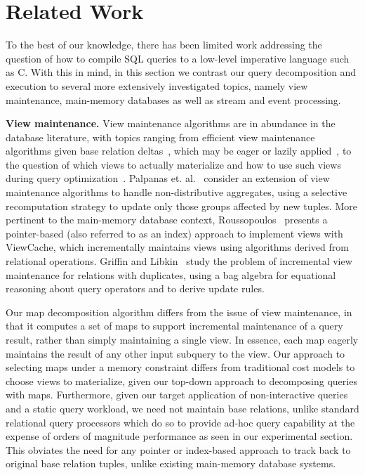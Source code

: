 \section{Related Work}

To the best of our knowledge, there has been limited work addressing the
question of how to compile SQL queries to a low-level imperative language such
as C. With this in mind, in this section we contrast our query decomposition
and execution to several more extensively investigated topics, namely view
maintenance, main-memory databases as well as stream and event processing.

\textbf{View maintenance.}
View maintenance algorithms are in abundance in the database literature, with
topics ranging from efficient view maintenance algorithms given base relation
deltas~\cite{colby-sigmod:96}, which may be eager or lazily
applied~\cite{yan-vldb:95,zhou-vldb:07}, to the question of which views to
actually materialize and how to use such views during query
optimization~\cite{kotidis-tods:01,zhou-icde:07}. 
Palpanas et. al.~\cite{palpanas-vldb:02} consider an extension of view
maintenance algorithms to handle non-distributive aggregates, using a selective
recomputation strategy to update only those groups affected by new tuples.
More pertinent to the main-memory database context,
Roussopoulos~\cite{roussopoulos-tods:91} presents a pointer-based (also referred
to as an index) approach to implement views with ViewCache, which incrementally
maintains views using algorithms derived from relational operations.
Griffin and Libkin~\cite{griffin-sigmod:95} study the problem of
incremental view maintenance for relations with duplicates, using a bag algebra
for equational reasoning about query operators and to derive update rules.

Our map decomposition algorithm differs from the issue of view maintenance, in
that it computes a set of maps to support incremental maintenance of a query
result, rather than simply maintaining a single view. In essence, each map
eagerly maintains the result of any other input subquery to the view. Our
approach to selecting maps under a memory constraint differs from traditional
cost models to choose views to materialize, given our top-down approach to
decomposing queries with maps. Furthermore, given our target application of
non-interactive queries and a static query workload, we need not maintain base
relations, unlike standard relational query processors which do so to provide
ad-hoc query capability at the expense of orders of magnitude performance as seen
in our experimental section. This obviates the need for any pointer or
index-based approach to track back to original base relation tuples, unlike
existing main-memory database systems.

